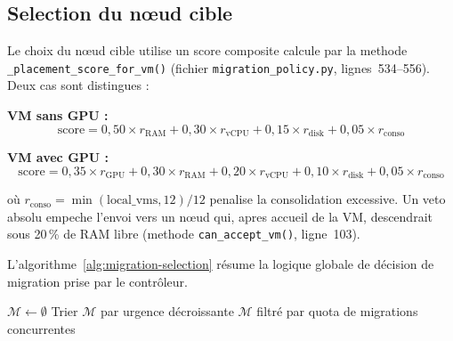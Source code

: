 \subsection{Selection du nœud cible}
\label{subsec:selection-cible}

Le choix du nœud cible utilise un score composite calcule par la methode \texttt{\_placement\_score\_for\_vm()} (fichier \texttt{migration\_policy.py}, lignes~534--556). Deux cas sont distingues :

\textbf{VM sans GPU :}
\begin{equation}
    \label{eq:score-sans-gpu}
    \text{score} = 0{,}50 \times r_{\text{RAM}} + 0{,}30 \times r_{\text{vCPU}} + 0{,}15 \times r_{\text{disk}} + 0{,}05 \times r_{\text{conso}}
\end{equation}

\textbf{VM avec GPU :}
\begin{equation}
    \label{eq:score-avec-gpu}
    \text{score} = 0{,}35 \times r_{\text{GPU}} + 0{,}30 \times r_{\text{RAM}} + 0{,}20 \times r_{\text{vCPU}} + 0{,}10 \times r_{\text{disk}} + 0{,}05 \times r_{\text{conso}}
\end{equation}

o\`u $r_{\text{conso}} = \min(\text{local\_vms}, 12) / 12$ penalise la consolidation excessive. Un veto absolu empeche l'envoi vers un nœud qui, apres accueil de la VM, descendrait sous 20\,\% de RAM libre (methode \texttt{can\_accept\_vm()}, ligne~103).

L'algorithme~\ref{alg:migration-selection} résume la logique globale de décision de migration prise par le contrôleur.

\begin{algorithm}[H]
    \DontPrintSemicolon

    $\mathcal{M} \leftarrow \emptyset$\;
    Trier $\mathcal{M}$ par urgence décroissante\;
    \Return $\mathcal{M}$ filtré par quota de migrations concurrentes\;
    \caption{Évaluation et sélection des migrations cluster-wide}
    \label{alg:migration-selection}
\end{algorithm}

